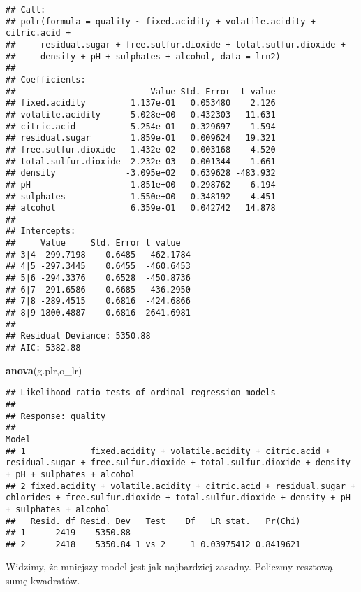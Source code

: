 \documentclass[
]{article}
\newenvironment{Shaded}{\begin{snugshade}}{\end{snugshade}}
\newcommand{\FunctionTok}[1]{\textcolor[rgb]{0.13,0.29,0.53}{\textbf{#1}}}
\newcommand{\NormalTok}[1]{#1}
\begin{document}
\begin{verbatim}
## Call:
## polr(formula = quality ~ fixed.acidity + volatile.acidity + citric.acid + 
##     residual.sugar + free.sulfur.dioxide + total.sulfur.dioxide + 
##     density + pH + sulphates + alcohol, data = lrn2)
## 
## Coefficients:
##                           Value Std. Error  t value
## fixed.acidity         1.137e-01   0.053480    2.126
## volatile.acidity     -5.028e+00   0.432303  -11.631
## citric.acid           5.254e-01   0.329697    1.594
## residual.sugar        1.859e-01   0.009624   19.321
## free.sulfur.dioxide   1.432e-02   0.003168    4.520
## total.sulfur.dioxide -2.232e-03   0.001344   -1.661
## density              -3.095e+02   0.639628 -483.932
## pH                    1.851e+00   0.298762    6.194
## sulphates             1.550e+00   0.348192    4.451
## alcohol               6.359e-01   0.042742   14.878
## 
## Intercepts:
##     Value     Std. Error t value  
## 3|4 -299.7198    0.6485  -462.1784
## 4|5 -297.3445    0.6455  -460.6453
## 5|6 -294.3376    0.6528  -450.8736
## 6|7 -291.6586    0.6685  -436.2950
## 7|8 -289.4515    0.6816  -424.6866
## 8|9 1800.4887    0.6816  2641.6981
## 
## Residual Deviance: 5350.88 
## AIC: 5382.88
\end{verbatim}

\begin{Shaded}
\begin{Highlighting}[]
\FunctionTok{anova}\NormalTok{(g.plr,o\_lr)}
\end{Highlighting}
\end{Shaded}

\begin{verbatim}
## Likelihood ratio tests of ordinal regression models
## 
## Response: quality
##                                                                                                                                                           Model
## 1             fixed.acidity + volatile.acidity + citric.acid + residual.sugar + free.sulfur.dioxide + total.sulfur.dioxide + density + pH + sulphates + alcohol
## 2 fixed.acidity + volatile.acidity + citric.acid + residual.sugar + chlorides + free.sulfur.dioxide + total.sulfur.dioxide + density + pH + sulphates + alcohol
##   Resid. df Resid. Dev   Test    Df   LR stat.   Pr(Chi)
## 1      2419    5350.88                                  
## 2      2418    5350.84 1 vs 2     1 0.03975412 0.8419621
\end{verbatim}

Widzimy, że mniejszy model jest jak najbardziej zasadny. Policzmy
resztową sumę kwadratów.
\end{document}
